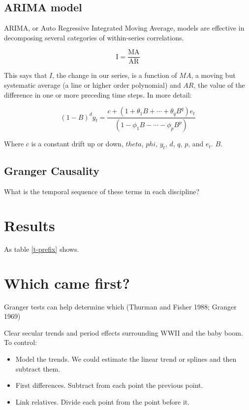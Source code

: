 \subsection{ARIMA model}\label{arima-model}

ARIMA, or Auto Regressive Integrated Moving Average, models are
effective in decomposing several categories of within-series
correlations.

\begin{equation}
\text{I} = \frac{\text{MA}}{\text{AR}}
\end{equation}

This says that \(I\), the change in our series, is a function of \(MA\),
a moving but systematic average (a line or higher order polynomial) and
\(AR\), the value of the difference in one or more preceding time steps.
In more detail:

\begin{equation}
 (1-B)^d y_{t} = \frac{c + (1 + \theta_1 B + \cdots + \theta_q B^q)e_t}{(1-\phi_1B - \cdots - \phi_p B^p)}
\end{equation}

Where \(c\) is a constant drift up or down, \(theta\), \(phi\),
\(y_{t}\), \(d\), \(q\), \(p\), and \(e_t\). \(B\).

\subsection{Granger Causality}\label{granger-causality}

What is the temporal sequence of these terms in each discipline?

\section{Results}\label{results}

As table \ref{t-prefix} shows.

\section{Which came first?}\label{which-came-first}

Granger tests can help determine which (Thurman and Fisher 1988; Granger
1969)

Clear secular trends and period effects surrounding WWII and the baby
boom. To control:

\begin{itemize}
\tightlist
\item
  Model the trends. We could estimate the linear trend or splines and
  then subtract them.
\item
  First differences. Subtract from each point the previous point.
\item
  Link relatives. Divide each point from the point before it.
\end{itemize}


